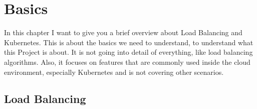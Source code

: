 \chapter{Basics}

In this chapter I want to give you a brief overview about Load Balancing and Kubernetes.
This is about the basics we need to understand, to understand what this Project is about.
It is not going into detail of everything, like load balancing algorithms.
Also, it focuses on features that are commonly used inside the cloud environment, especially Kubernetes and is not covering other scenarios.

\section{Load Balancing}

